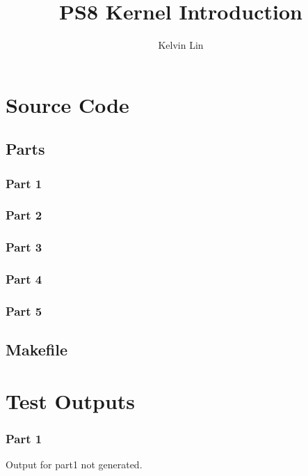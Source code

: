 \documentclass[12pt]{article}
\title{PS8 Kernel Introduction}
\author{Kelvin Lin}
\begin{document}
\maketitle

\section{Source Code}

\subsection{Parts}

\subsubsection{Part 1}


\subsubsection{Part 2}


\subsubsection{Part 3}


\subsubsection{Part 4}


\subsubsection{Part 5}


\subsection{Makefile}



\section {Test Outputs}

\subsubsection{Part 1}
Output for part1 not generated.
\end{document}
